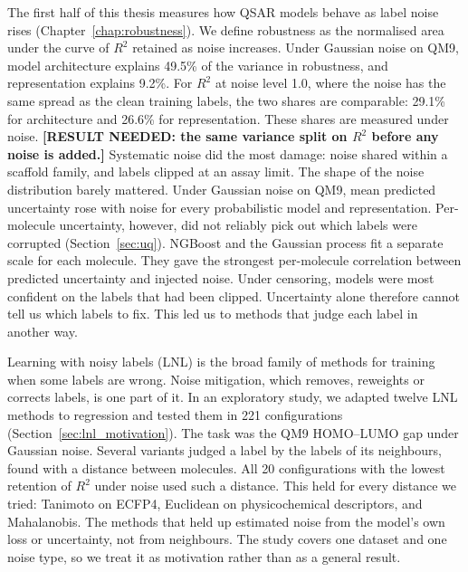 The first half of this thesis measures how QSAR models behave as label noise rises (Chapter~\ref{chap:robustness}). We define robustness as the normalised area under the curve of $R^2$ retained as noise increases. Under Gaussian noise on QM9, model architecture explains 49.5\% of the variance in robustness, and representation explains 9.2\%. For $R^2$ at noise level 1.0, where the noise has the same spread as the clean training labels, the two shares are comparable: 29.1\% for architecture and 26.6\% for representation. These shares are measured under noise. \textbf{[RESULT NEEDED: the same variance split on $R^2$ before any noise is added.]} Systematic noise did the most damage: noise shared within a scaffold family, and labels clipped at an assay limit. The shape of the noise distribution barely mattered. Under Gaussian noise on QM9, mean predicted uncertainty rose with noise for every probabilistic model and representation. Per-molecule uncertainty, however, did not reliably pick out which labels were corrupted (Section~\ref{sec:uq}). NGBoost and the Gaussian process fit a separate scale for each molecule. They gave the strongest per-molecule correlation between predicted uncertainty and injected noise. Under censoring, models were most confident on the labels that had been clipped. Uncertainty alone therefore cannot tell us which labels to fix. This led us to methods that judge each label in another way.

Learning with noisy labels (LNL) is the broad family of methods for training when some labels are wrong. Noise mitigation, which removes, reweights or corrects labels, is one part of it. In an exploratory study, we adapted twelve LNL methods to regression and tested them in 221 configurations (Section~\ref{sec:lnl_motivation}). The task was the QM9 HOMO--LUMO gap under Gaussian noise. Several variants judged a label by the labels of its neighbours, found with a distance between molecules. All 20 configurations with the lowest retention of $R^2$ under noise used such a distance. This held for every distance we tried: Tanimoto on ECFP4, Euclidean on physicochemical descriptors, and Mahalanobis. The methods that held up estimated noise from the model's own loss or uncertainty, not from neighbours. The study covers one dataset and one noise type, so we treat it as motivation rather than as a general result.

